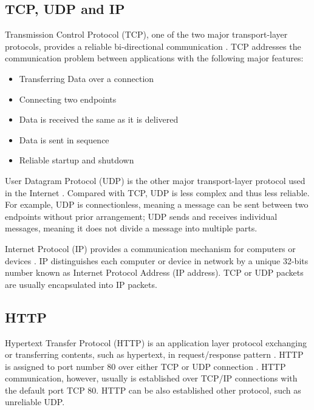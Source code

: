 \subsection{TCP, UDP and IP}
Transmission Control Protocol (TCP), one of the two major transport-layer protocols, provides a reliable bi-directional communication \cite{comer2008computer}. TCP addresses the communication problem between applications with the following major features: 

\begin{itemize}
\setlength{\itemsep}{0pt}
\item Transferring Data over a connection 
\item Connecting two endpoints
\item Data is received the same as it is delivered
\item Data is sent in sequence
\item Reliable startup and shutdown
\end{itemize}

User Datagram Protocol (UDP) is the other major transport-layer protocol used in the Internet \cite{comer2008computer}. Compared with TCP, UDP is less complex and thus less reliable. For example, UDP is connectionless, meaning a message can be sent between two endpoints without prior arrangement; UDP sends and receives individual messages, meaning it does not divide a message into multiple parts.

Internet Protocol (IP) provides a communication mechanism for computers or devices \cite{postel1981internet}. IP distinguishes each computer or device in network by a unique 32-bits number known as Internet Protocol Address (IP address). TCP or UDP packets are usually encapsulated into IP packets.

\subsection{HTTP}

Hypertext Transfer Protocol (HTTP) is an application layer protocol exchanging or transferring contents, such as hypertext, in request/response pattern \cite{fielding1999hypertext}. HTTP is assigned to port number 80 over either TCP or UDP connection \cite{reynolds1994assigned}. HTTP communication, however, usually is established over TCP/IP connections with the default port TCP 80. HTTP can be also established other protocol, such as unreliable UDP.

